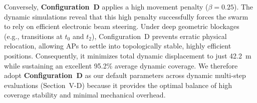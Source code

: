 Conversely, \textbf{Configuration~D} applies a high movement penalty ($\beta = 0.25$). The dynamic simulations reveal that this high penalty successfully forces the swarm to rely on efficient electronic beam steering. Under deep geometric blockages (e.g., transitions at $t_0$ and $t_2$), Configuration~D prevents erratic physical relocation, allowing APs to settle into topologically stable, highly efficient positions. Consequently, it minimizes total dynamic displacement to just 42.2~m while sustaining an excellent 95.2\% average dynamic coverage. We therefore adopt \textbf{Configuration~D} as our default parameters across dynamic multi-step evaluations (Section~V-D) because it provides the optimal balance of high coverage stability and minimal mechanical overhead.
